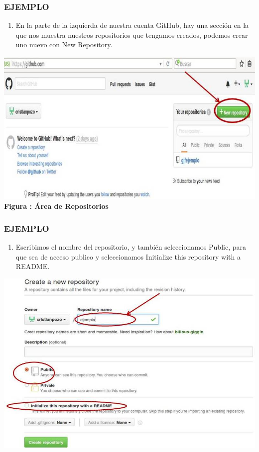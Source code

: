 \documentclass[8pt]{beamer}
\begin{document}
\begin{frame}
\frametitle{EJEMPLO}
\begin{enumerate}[3. ]
	\justifying
    \item En la parte de la izquierda de nuestra cuenta GitHub, hay una sección en la que nos muestra nuestros repositorios que tengamos creados, podemos crear uno nuevo con New Repository.
\end{enumerate}
\begin{center}
\includegraphics[width=6 cm]{img/b3}\\
\textbf{Figura : Área de Repositorios}
\end{center}
\end{frame}

\begin{frame}
\frametitle{EJEMPLO}
\begin{enumerate}[4. ]
	\justifying
    \item Escribimos el nombre del repositorio, y también seleccionamos Public, para que sea de acceso publico y seleccionamos Initialize this repository with a README.
\end{enumerate}
\begin{center}
\includegraphics[width=7.5 cm]{img/b4}\\
\fontsize{6}{1}
\end{center}
\end{frame}
\end{document}
